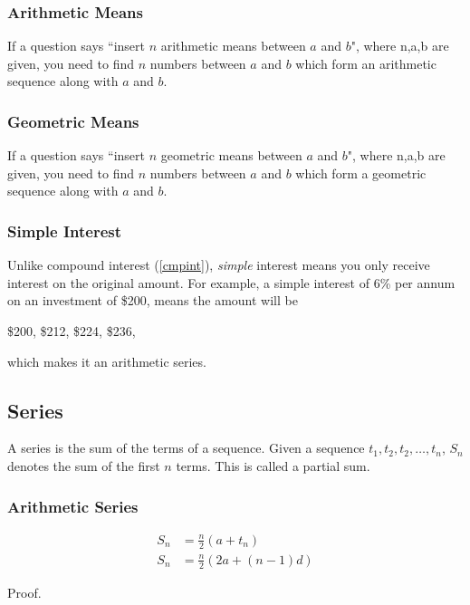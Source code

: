 \documentclass{article}
\numberwithin{equation}{section}
\begin{document}
\subsubsection{Arithmetic Means}
If a question says ``insert $n$ arithmetic means between $a$ and $b$", where n,a,b are given, you need to find $n$ numbers between $a$ and $b$ which form an arithmetic sequence along with $a$ and $b$.

\subsubsection{Geometric Means}
If a question says ``insert $n$ geometric means between $a$ and $b$", where n,a,b are given, you need to find $n$ numbers between $a$ and $b$ which form a geometric sequence along with $a$ and $b$.

\subsubsection{Simple Interest}
Unlike compound interest (\ref{cmpint}), \emph{simple} interest means you only receive interest on the original amount. For example, a simple interest of 6\% per annum on an investment of \$200, means the amount will be

\begin{center}
	\$200, \$212, \$224, \$236, \dotso
\end{center}
which makes it an arithmetic series.

\subsection{Series}
A series is the sum of the terms of a sequence.
Given a sequence $t_1, t_2, t_2, \dotsc, t_n$,
$S_n$ denotes the sum of the first $n$ terms.
This is called a partial sum.

\subsubsection{Arithmetic Series}

\begin{align}
	S_n & = \frac{n}{2} (a + t_n) \label{arithseries1} \\
	S_n & = \frac{n}{2} (2a + (n-1) d ) \label{arithseries2}
\end{align}

\noindent
Proof.
\end{document}
